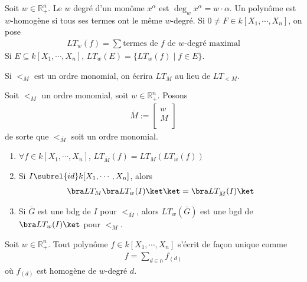         \begin{defi}
            Soit $w \in \mathbb{R}^n_+$. Le $w$ degré d'un monôme $x^\alpha$ est $\deg_w x^\alpha = w \cdot \alpha$. Un polynôme est $w$-homogène si tous ses termes ont le même $w$-degré. Si $0 \neq F \in k[X_1, \cdots, X_n]$, on pose 
            \begin{align*}
                LT_w(f) = \sum \text{termes de $f$ de $w$-degré maximal}
            \end{align*}
            Si $E \subseteq k[X_1, \cdots, X_n]$, $LT_w(E) = \{LT_w(f) \mid f \in E\}$.
        \end{defi}
        \begin{nota}
            Si $<_M$ est un ordre monomial, on écrira $LT_M$ au lieu de $LT_{<M}$.
        \end{nota}
        \begin{prop}
            Soit $<_M$ un ordre monomial, soit $w \in \mathbb{R}_+^n$. Posons
            \begin{align*}
                \bar M :=
                \begin{bmatrix}
                    w \\
                    M \\
                \end{bmatrix}
            \end{align*}
            de sorte que $<_{\bar M}$ soit un ordre monomial.
            \begin{enumerate}
                \item $\forall f \in k[X_1, \cdots, X_n]$, $LT_{\bar M}(f) = LT_M(LT_w(f))$
                \item Si $I \subrel{id} k[X_1, \cdots, X_n]$, alors
                \begin{align*}
                    \bra LT_M \bra LT_w(I) \ket \ket = \bra LT_{\bar M}(I) \ket
                \end{align*}
                \item Si $\bar G$ est une bdg de $I$ pour $<_{\bar M}$, alors $LT_w(\bar G)$ est une bgd de $\bra LT_w(I) \ket$ pour $<_M$.
            \end{enumerate}
        \end{prop}
        \begin{lemm}
            Soit $w \in \mathbb{R}_+^n$. Tout polynôme $f \in k[X_1, \cdots, X_n]$ s'écrit de façon unique comme 
            \begin{align*}
                f = \sum_{d \in \mathbb{n}} f_{(d)}
            \end{align*}
            où $f_{(d)}$ est homogène de $w$-degré $d$.
        \end{lemm}
